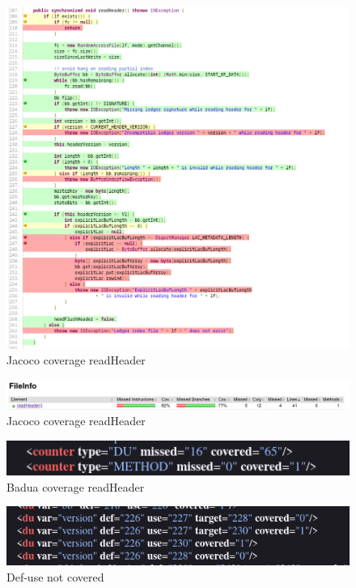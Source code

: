 \documentclass[10pt, a4paper]{article}
\begin{document}
  \begin{figure}
    \includegraphics[width=\linewidth]{./images/file_info/JacocoCoveragereadHeader2.png}
    \caption{Jacoco coverage readHeader}
    \label{fig:JacocoCoveragereadHeader2}
  \end{figure}

  \begin{figure}
    \includegraphics[width=\linewidth]{./images/file_info/JacocoCoveragereadHeader3.png}
    \caption{Jacoco coverage readHeader}
    \label{fig:JacocoCoveragereadHeader3}
  \end{figure}

  \begin{figure}
    \includegraphics[width=\linewidth]{./images/file_info/BaduaCoverageReadHeader1.png}
    \caption{Badua coverage readHeader}
    \label{fig:BaduaCoverageReadHeader1}
  \end{figure}

  \begin{figure}
    \includegraphics[width=\linewidth]{./images/file_info/BaduaCoverageReadHeader2.png}
    \caption{Def-use not covered}
    \label{fig:BaduaCoverageReadHeader2}
  \end{figure}
\end{document}

